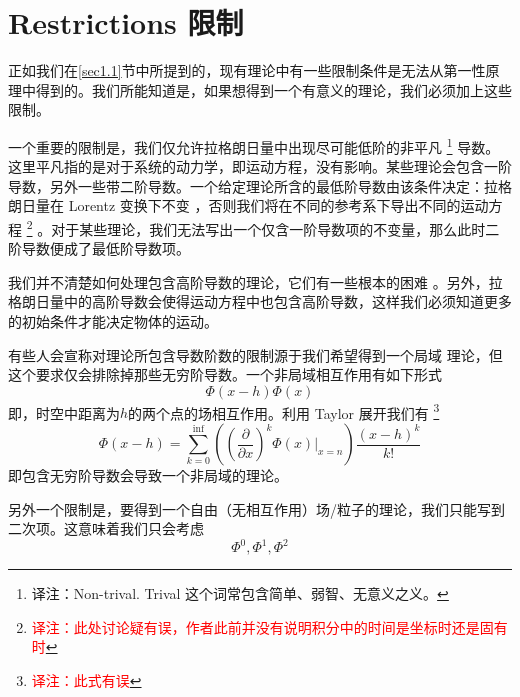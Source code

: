 \section{Restrictions 限制}\label{sec4.2}
正如我们在\ref{sec1.1}节中所提到的，现有理论中有一些限制条件是无法从第一性原理中得到的。我们所能知道是，如果想得到一个有意义的理论，我们必须加上这些限制。

一个重要的限制是，我们仅允许拉格朗日量中出现尽可能低阶的非平凡%
\footnote{译注：Non-trival. Trival 这个词常包含简单、弱智、无意义之义。}%
导数。这里平凡指的是对于系统的动力学，即运动方程，没有影响。某些理论会包含一阶导数，另外一些带二阶导数。一个给定理论所含的最低阶导数由该条件决定：拉格朗日量在 Lorentz 变换下不变%
%
，否则我们将在不同的参考系下导出不同的运动方程%
\footnote{\textcolor{red}{译注：此处讨论疑有误，作者此前并没有说明积分中的时间是坐标时还是固有时}}%
。对于某些理论，我们无法写出一个仅含一阶导数项的不变量，那么此时二阶导数便成了最低阶导数项。

我们并不清楚如何处理包含高阶导数的理论，它们有一些根本的困难%
%
。另外，拉格朗日量中的高阶导数会使得运动方程中也包含高阶导数，这样我们必须知道更多的初始条件才能决定物体的运动。

有些人会宣称对理论所包含导数阶数的限制源于我们希望得到一个局域%
%
理论，但这个要求仅会排除掉那些无穷阶导数。一个非局域相互作用有如下形式%
\begin{equation}
\Phi(x-h)\Phi(x)
\end{equation}
即，时空中距离为\(h\)的两个点的场相互作用。利用 Taylor 展开我们有%
\footnote{\textcolor{red}{译注：此式有误}}
\begin{equation}
\Phi(x-h) = \sum\limits_{k=0}^{\inf}\left(\left(\frac{\partial}{\partial x}\right)^k\left.\Phi(x)\right|_{x=n}\right) \frac{(x-h)^k}{k!}
\end{equation}
即包含无穷阶导数会导致一个非局域的理论。

另外一个限制是，要得到一个自由（无相互作用）场/粒子的理论，我们只能写到二次项。这意味着我们只会考虑%
\[
\Phi^0, \Phi^1, \Phi^2
\]